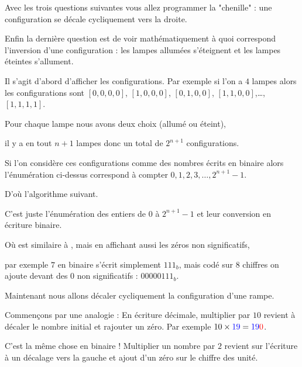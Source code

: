 Avec les trois questions suivantes vous allez programmer la "chenille" : une configuration 
se décale cycliquement vers la droite.

Enfin la dernière question est de voir mathématiquement à quoi correspond l'inversion d'une configuration :
les lampes allumées s'éteignent et les lampes éteintes s'allument.


\diapo

Il s'agit d'abord d'afficher les configurations. Par exemple si l'on a $4$ lampes alors
les configurations sont $[0,0,0,0]$, $[1,0,0,0]$, $[0,1,0,0]$, $[1,1,0,0]$,\ldots, $[1,1,1,1]$.

\change

Pour chaque lampe nous avons deux choix (allumé ou éteint),

\change

 il y a en tout $n+1$ lampes donc un total de $2^{n+1}$ configurations.

\change

 Si l'on considère ces configurations comme des nombres écrits en binaire alors 
l'énumération ci-dessus correspond à compter $0,1,2,3,\ldots, 2^{n+1}-1$.

\change

D'où l'algorithme suivant.

C'est juste l'énumération des entiers de $0$ à $2^{n+1}-1$
et leur conversion en écriture binaire.


\change

Où  est similaire à ,
mais en affichant aussi les zéros non significatifs,

\change

par exemple $7$ en binaire s'écrit simplement $111_b$,
mais codé sur $8$ chiffres on ajoute devant des $0$ non significatifs : $00000111_b$.




\diapo

Maintenant nous allons décaler cycliquement la configuration d'une rampe.


Commençons par une analogie : 
En écriture décimale, multiplier par $10$ revient à décaler le nombre initial et rajouter un zéro.
Par exemple $10\times{\color{blue}19} = {\color{blue}19}{\color{red}0}$.

\change

C'est la même chose en binaire !
Multiplier un nombre par $2$ revient sur l'écriture à un décalage 
vers la gauche et ajout d'un zéro sur le chiffre des unité.

